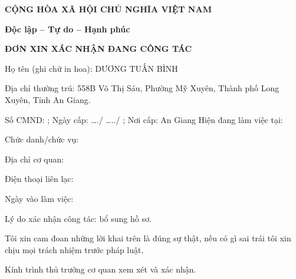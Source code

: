\documentclass{report}
\begin{document}
\begin{center}
  \textbf{CỘNG HÒA XÃ HỘI CHỦ NGHĨA VIỆT NAM}

  \textbf{Độc lập -- Tự do -- Hạnh phúc}
  \vspace{5pt}
  \hline


  
  
 \large\textbf{{ĐƠN XIN XÁC NHẬN ĐANG CÔNG TÁC}}

 

\end{center}
\noindent

Họ tên (ghi chữ in hoa): DƯƠNG TUẤN BÌNH 

Địa chỉ thường trú: 558B Võ Thị Sáu, Phường Mỹ Xuyên, Thành phố Long Xuyên, Tỉnh An Giang.

Số CMND:	; Ngày cấp: …./ …../	; Nơi cấp: An Giang
Hiện đang làm việc tại: 
	
Chức danh/chức vụ:
	
Địa chỉ cơ quan:
	
Điện thoại liên lạc:
	
Ngày vào làm việc:
	
Lý do xác nhận công tác: bổ sung hồ sơ.

Tôi xin cam đoan những lời khai trên là đúng sự thật, nếu có gì sai trái tôi xin chịu mọi trách nhiệm trước pháp luật.

Kính trình thủ trưởng cơ quan xem xét và xác nhận.
\end{document}

